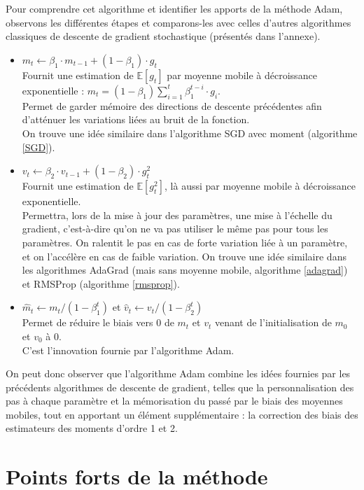 \documentclass[11pt,a4paper, french]{article}
\newcommand{\dsum}[2]{\displaystyle\sum_{#1}^{#2}}
\newcommand{\bit}{\begin{itemize}}
\newcommand{\eit}{\end{itemize}}
\begin{document}
Pour comprendre cet algorithme et identifier les apports de la méthode Adam, observons les différentes étapes et comparons-les avec celles d'autres algorithmes classiques de descente de gradient stochastique (présentés dans l'annexe).

\bit
\item $m_t \longleftarrow \beta_1\cdotp m_{t-1}+(1-\beta_1)\cdotp g_t$\\
Fournit une estimation de $\mathbb E[g_t]$ par moyenne mobile à décroissance exponentielle : $m_t=(1-\beta_1)\dsum{i=1}t\beta_1^{t-i}\cdotp g_i$.\\
Permet de garder mémoire des directions de descente précédentes afin d'atténuer les variations liées au bruit de la fonction.\\
On trouve une idée similaire dans l'algorithme SGD  avec moment (algorithme \ref{SGD}).

\item $v_t \longleftarrow \beta_2\cdotp v_{t-1}+(1-\beta_2)\cdotp g_t^2$\\
Fournit une estimation de $\mathbb E[g_t^2]$, là aussi par moyenne mobile à décroissance exponentielle.\\
Permettra, lors de la mise à jour des paramètres, une mise à l'échelle du gradient, c'est-à-dire qu'on ne va pas utiliser le même pas pour tous les paramètres. On ralentit le pas en cas de forte variation liée à un paramètre, et on l'accélère en cas de faible variation. 
On trouve une idée similaire dans les algorithmes AdaGrad (mais sans moyenne mobile, algorithme \ref{adagrad}) et RMSProp (algorithme \ref{rmsprop}). 

\item  $\widehat m_t \longleftarrow m_t/(1-\beta_1^t)$ et 
$\widehat v_t \longleftarrow v_t/(1-\beta_2^t)$\\
Permet de réduire le biais vers 0 de $m_t$ et $v_t$ venant de l'initialisation de $m_0$ et $v_0$ à 0. \\
C'est l'innovation fournie par l'algorithme Adam.
\eit

On peut donc observer que l'algorithme Adam combine les idées fournies par les précédents algorithmes de descente de gradient, telles que la personnalisation des pas à chaque paramètre et la mémorisation du passé par le biais des moyennes mobiles, tout en apportant un élément supplémentaire : la correction des biais des estimateurs des moments d'ordre 1 et 2. 



\section{Points forts de la méthode}
\end{document}
